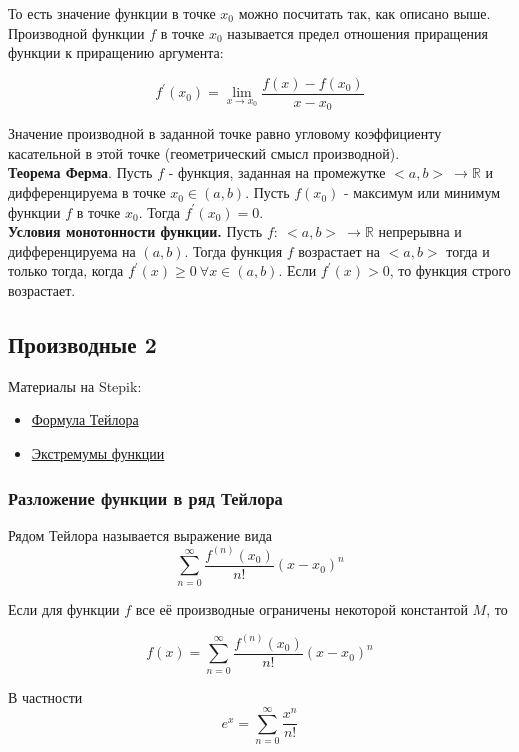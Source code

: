 \documentclass{article}
\begin{document}
То есть значение функции в точке $x_0$ можно посчитать так, как описано выше. \\

Производной функции $f$ в точке $x_0$ называется предел отношения приращения функции к приращению аргумента:

$$ f^{\prime}(x_0) = \lim\limits_{x \to x_0} \frac{f(x) - f(x_0)}{x - x_0} $$

Значение производной в заданной точке равно угловому коэффициенту касательной в этой точке (геометрический смысл производной). \\

\textbf{Теорема Ферма}. Пусть $f$ - функция, заданная на промежутке $<a, b> \ \to \mathbb{R}$ и дифференцируема в точке $x_0 \in (a, b)$. Пусть $f(x_0)$ - максимум или минимум функции $f$ в точке $x_0$. Тогда $f^{\prime}(x_0) = 0$. \\

\textbf{Условия монотонности функции.} Пусть $f: \ <a, b> \ \to \mathbb{R}$ непрерывна и дифференцируема на $(a, b)$. Тогда функция $f$ возрастает на $<a, b>$ тогда и только тогда, когда $f^{\prime}(x) \ge 0 \ \forall x \in (a, b)$. Если $f^{\prime}(x) > 0$, то функция строго возрастает.

\subsection{Производные 2}

Материалы на Stepik:

\begin{itemize}
	\item \href{https://stepik.org/lesson/32797/step/1}{Формула Тейлора}
	\item \href{https://stepik.org/lesson/28372/step/2}{Экстремумы функции}
\end{itemize}

\subsubsection{Разложение функции в ряд Тейлора}

Рядом Тейлора называется выражение вида $$ \sum_{n = 0}^{\infty} \frac{f^{(n)}(x_0)}{n!} (x - x_0)^n $$

Если для функции $f$ все её производные ограничены некоторой константой $M$, то 

$$ f(x) = \sum_{n = 0}^{\infty} \frac{f^{(n)}(x_0)}{n!} (x - x_0)^n $$

В частности $$e^x = \sum_{n = 0}^{\infty} \frac{x^n}{n!}$$
\end{document}
